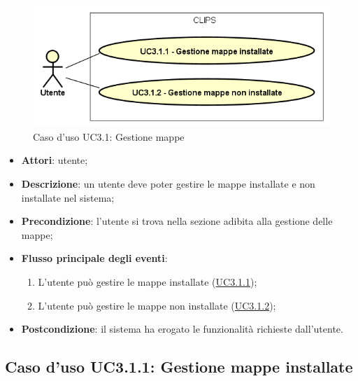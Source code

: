 \documentclass[../AnalisiDeiRequisiti.tex]{subfiles}
\begin{document}
\begin{figure}[H]
	\centering
	\includegraphics[scale=0.95, width=\textwidth]{img/UC3-1.png}
	\caption{Caso d'uso UC3.1: Gestione mappe}\label{fig:UC3.1} 
\end{figure}
\begin{itemize}
	\item \textbf{Attori}: utente;
	\item \textbf{Descrizione}: un utente deve poter gestire le mappe installate e non installate nel sistema; 
	\item \textbf{Precondizione}: l'utente si trova nella sezione adibita alla gestione delle mappe;
	
	\item \textbf{Flusso principale degli eventi}:
	\begin{enumerate}
		\item L'utente può gestire le mappe installate (\hyperlink{UC3.1.1}{UC3.1.1});
		\item L'utente può gestire le mappe non installate (\hyperlink{UC3.1.2}{UC3.1.2});
		
	\end{enumerate}
	\item \textbf{Postcondizione}: il sistema ha erogato le funzionalità richieste dall'utente.
\end{itemize}
\hypertarget{UC3.1.1}{}
\subsection{Caso d'uso UC3.1.1: Gestione mappe installate}
\end{document}
